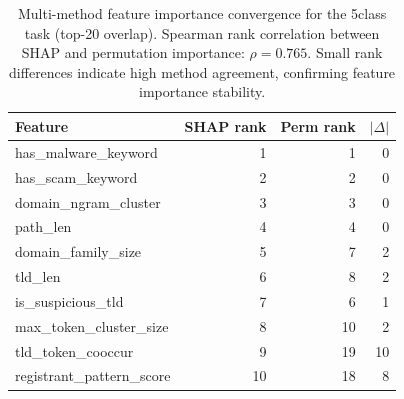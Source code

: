 \begin{table}[htbp]
\centering
\caption{Multi-method feature importance convergence for the 5class task (top-20 overlap). Spearman rank correlation between SHAP and permutation importance: $\rho=0.765$. Small rank differences indicate high method agreement, confirming feature importance stability.}
\label{tab:convergence_5class}
\footnotesize
\begin{tabular}{lrrr}
\toprule
Feature & SHAP rank & Perm rank & $|\Delta|$ \\
\midrule
has\_malware\_keyword & 1 & 1 & 0 \\
has\_scam\_keyword & 2 & 2 & 0 \\
domain\_ngram\_cluster & 3 & 3 & 0 \\
path\_len & 4 & 4 & 0 \\
domain\_family\_size & 5 & 7 & 2 \\
tld\_len & 6 & 8 & 2 \\
is\_suspicious\_tld & 7 & 6 & 1 \\
max\_token\_cluster\_size & 8 & 10 & 2 \\
tld\_token\_cooccur & 9 & 19 & 10 \\
registrant\_pattern\_score & 10 & 18 & 8 \\
\bottomrule
\end{tabular}
\end{table}